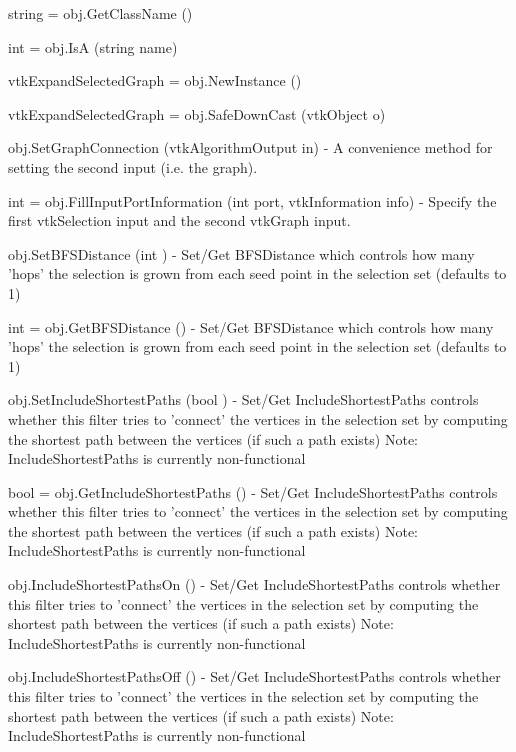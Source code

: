 \begin{DoxyItemize}
\item {\ttfamily string = obj.\-Get\-Class\-Name ()}  
\item {\ttfamily int = obj.\-Is\-A (string name)}  
\item {\ttfamily vtk\-Expand\-Selected\-Graph = obj.\-New\-Instance ()}  
\item {\ttfamily vtk\-Expand\-Selected\-Graph = obj.\-Safe\-Down\-Cast (vtk\-Object o)}  
\item {\ttfamily obj.\-Set\-Graph\-Connection (vtk\-Algorithm\-Output in)} -\/ A convenience method for setting the second input (i.\-e. the graph).  
\item {\ttfamily int = obj.\-Fill\-Input\-Port\-Information (int port, vtk\-Information info)} -\/ Specify the first vtk\-Selection input and the second vtk\-Graph input.  
\item {\ttfamily obj.\-Set\-B\-F\-S\-Distance (int )} -\/ Set/\-Get B\-F\-S\-Distance which controls how many 'hops' the selection is grown from each seed point in the selection set (defaults to 1)  
\item {\ttfamily int = obj.\-Get\-B\-F\-S\-Distance ()} -\/ Set/\-Get B\-F\-S\-Distance which controls how many 'hops' the selection is grown from each seed point in the selection set (defaults to 1)  
\item {\ttfamily obj.\-Set\-Include\-Shortest\-Paths (bool )} -\/ Set/\-Get Include\-Shortest\-Paths controls whether this filter tries to 'connect' the vertices in the selection set by computing the shortest path between the vertices (if such a path exists) Note\-: Include\-Shortest\-Paths is currently non-\/functional  
\item {\ttfamily bool = obj.\-Get\-Include\-Shortest\-Paths ()} -\/ Set/\-Get Include\-Shortest\-Paths controls whether this filter tries to 'connect' the vertices in the selection set by computing the shortest path between the vertices (if such a path exists) Note\-: Include\-Shortest\-Paths is currently non-\/functional  
\item {\ttfamily obj.\-Include\-Shortest\-Paths\-On ()} -\/ Set/\-Get Include\-Shortest\-Paths controls whether this filter tries to 'connect' the vertices in the selection set by computing the shortest path between the vertices (if such a path exists) Note\-: Include\-Shortest\-Paths is currently non-\/functional  
\item {\ttfamily obj.\-Include\-Shortest\-Paths\-Off ()} -\/ Set/\-Get Include\-Shortest\-Paths controls whether this filter tries to 'connect' the vertices in the selection set by computing the shortest path between the vertices (if such a path exists) Note\-: Include\-Shortest\-Paths is currently non-\/functional  

\end{DoxyItemize}
